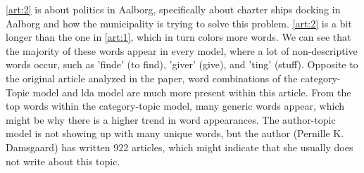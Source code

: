 \autoref{art:2} is about politics in Aalborg, specifically about charter ships docking in Aalborg and how the municipality is trying to solve this problem.
\autoref{art:2} is a bit longer than the one in \autoref{art:1}, which in turn colors more words.
We can see that the majority of these words appear in every model, where a lot of non-descriptive words occur, such as 'finde' (to find), 'giver' (give), and 'ting' (stuff). 
Opposite to the original article analyzed in the paper, word combinations of the category-Topic model and \gls{lda} model are much more present within this article.
From the top words within the category-topic model, many generic words appear, which might be why there is a higher trend in word appearances.
The author-topic model is not showing up with many unique words, but the author (Pernille K. Damsgaard) has written $922$ articles, which might indicate that she usually does not write about this topic.
\\
